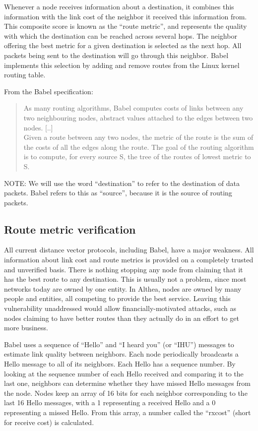 \documentclass[11pt]{article}
\begin{document}
Whenever a node receives information about a destination, it combines this information with the link cost of the neighbor it received this information from. This composite score is known as the ``route metric'', and represents the quality with which the destination can be reached across several hops. The neighbor offering the best metric for a given destination is selected as the next hop. All packets being sent to the destination will go through this neighbor. Babel implements this selection by adding and remove routes from the Linux kernel routing table.
 
From the Babel specification:
\begin{quote}
As many routing algorithms, Babel computes costs of links between any two neighbouring nodes, abstract values attached to the edges between two nodes.  [..]\\
Given a route between any two nodes, the metric of the route is the sum of the costs of all the edges along the route. The goal of the routing algorithm is to compute, for every source S, the tree of the routes of lowest metric to S.
\end{quote}

NOTE: We will use the word ``destination'' to refer to the destination of data packets. Babel refers to this as ``source'', because it is the source of routing packets.

\subsection{Route metric verification}
All current distance vector protocols, including Babel, have a major weakness. All information about link cost and route metrics is provided on a completely trusted and unverified basis. There is nothing stopping any node from claiming that it has the best route to any destination. This is usually not a problem, since most networks today are owned by one entity. In Althea, nodes are owned by many people and entities, all competing to provide the best service. Leaving this vulnerability unaddressed would allow financially-motivated attacks, such as nodes claiming to have better routes than they actually do in an effort to get more business.
 
Babel uses a sequence of ``Hello'' and ``I heard you'' (or ``IHU'') messages to estimate link quality between neighbors. Each node periodically broadcasts a Hello message to all of its neighbors. Each Hello has a sequence number. By looking at the sequence number of each Hello received and comparing it to the last one, neighbors can determine whether they have missed Hello messages from the node. Nodes keep an array of 16 bits for each neighbor corresponding to the last 16 Hello messages, with a 1 representing a received Hello and a 0 representing a missed Hello. From this array, a number called the ``rxcost'' (short for receive cost) is calculated.
\end{document}
